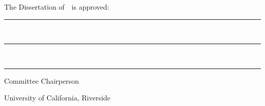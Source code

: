 \renewcommand{\theuniversity}{University of California, Riverside}
\newcommand{\signatureblock}[1]{%
  \begin{minipage}{10cm}
    \hrule\smallskip\hfill #1
  \end{minipage}
}

\clearpage
\thispagestyle{empty}
\vspace*{-\toptafiddle}

\vfill

\justify{}
The Dissertation of~\theauthor~is approved:

\vfill

\centering

\signatureblock{~}
\vfill
\signatureblock{~}
\vfill
\signatureblock{Committee Chairperson}

\vfill

\theuniversity{}

\vfill

\enlargethispage{\bottafiddle}
\clearpage
